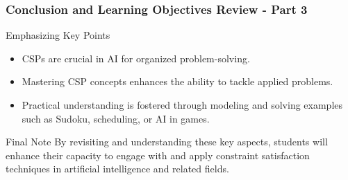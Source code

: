 \documentclass[aspectratio=169]{beamer}
\begin{document}
\begin{frame}[fragile]
    \frametitle{Conclusion and Learning Objectives Review - Part 3}
    \begin{block}{Emphasizing Key Points}
        \begin{itemize}
            \item CSPs are crucial in AI for organized problem-solving.
            \item Mastering CSP concepts enhances the ability to tackle applied problems.
            \item Practical understanding is fostered through modeling and solving examples such as Sudoku, scheduling, or AI in games.
        \end{itemize}
    \end{block}
    \begin{block}{Final Note}
        By revisiting and understanding these key aspects, students will enhance their capacity to engage with and apply constraint satisfaction techniques in artificial intelligence and related fields.
    \end{block}
\end{frame}
\end{document}
